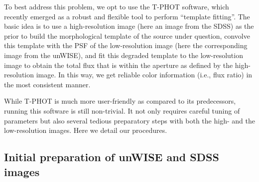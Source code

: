 \documentclass[apj,iop]{emulateapj}
\begin{document}
To best address this problem, we opt to use the T-PHOT software, which recently emerged as a robust and flexible tool to perform ``template fitting''. The basic idea is to use a high-resolution image (here an image from the SDSS) as the prior to build the morphological template of the source under question, convolve this template with the PSF of the low-resolution image (here the corresponding image from the unWISE), and fit this degraded template to the low-resolution image to obtain the total flux that is within the aperture as defined by the high-resolution image. In this way, we get reliable color information (i.e., flux ratio) in the most consistent manner. 

While T-PHOT is much more user-friendly as compared to its predecessors, running this software is still non-trivial. It not only requires careful tuning of parameters but also several tedious preparatory steps with both the high- and the low-resolution images. Here we detail our procedures.
	

\subsection{Initial preparation of unWISE and SDSS images} 

\end{document}
